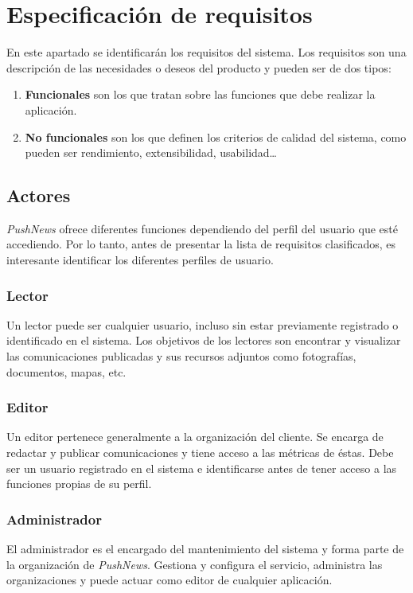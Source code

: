 \chapter{Especificación de requisitos}
En este apartado se identificarán los requisitos del sistema. Los requisitos son una descripción de las necesidades o deseos del producto \cite{Larman2004} y pueden ser de dos tipos:
\begin{enumerate}
    \item \textbf{Funcionales} son los que tratan sobre las funciones que debe realizar la aplicación.
    \item \textbf{No funcionales} son los que definen los criterios de calidad del sistema, como pueden ser rendimiento, extensibilidad, usabilidad\dots
\end{enumerate}

\section {Actores}
\emph{PushNews} ofrece diferentes funciones dependiendo del perfil del usuario que esté accediendo. Por lo tanto, antes de presentar la lista de requisitos clasificados, es interesante identificar los diferentes perfiles de usuario.

\subsection{Lector}
Un lector puede ser cualquier usuario, incluso sin estar previamente registrado o identificado en el sistema. Los objetivos de los lectores son encontrar y visualizar las comunicaciones publicadas y sus recursos adjuntos como fotografías, documentos, mapas, etc.

\subsection{Editor}
Un editor pertenece generalmente a la organización del cliente. Se encarga de redactar y publicar comunicaciones y tiene acceso a las métricas de éstas. Debe ser un usuario registrado en el sistema e identificarse antes de tener acceso a las funciones propias de su perfil.

\subsection{Administrador}
El administrador es el encargado del mantenimiento del sistema y forma parte de la organización de \emph{PushNews}. Gestiona y configura el servicio, administra las organizaciones y puede actuar como editor de cualquier aplicación.

